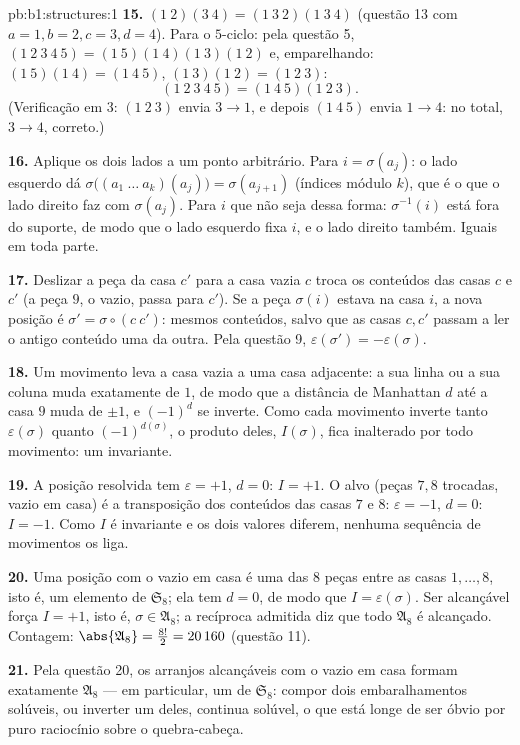 \begin{solution}{pb:b1:structures:1}
\textbf{15.} $(1\ 2)(3\ 4) = (1\ 3\ 2)(1\ 3\ 4)$ (questão 13
com $a{=}1, b{=}2, c{=}3, d{=}4$). Para o $5$-ciclo: pela
questão 5, $(1\ 2\ 3\ 4\ 5) = (1\ 5)(1\ 4)(1\ 3)(1\ 2)$ e,
emparelhando: $(1\ 5)(1\ 4) = (1\ 4\ 5)$, $(1\ 3)(1\ 2) = (1\ 2\ 3)$:
\[
(1\ 2\ 3\ 4\ 5) = (1\ 4\ 5)(1\ 2\ 3) .
\]
(Verificação em $3$: $(1\ 2\ 3)$ envia $3 \to 1$, e depois $(1\ 4\ 5)$
envia $1 \to 4$: no total, $3 \to 4$, correto.)

\textbf{16.} Aplique os dois lados a um ponto arbitrário. Para $i =
\sigma(a_j)$: o lado esquerdo dá $\sigma\bigl((a_1\ \dots\
a_k)(a_j)\bigr) = \sigma(a_{j+1})$ (índices módulo $k$), que é
o que o lado direito faz com $\sigma(a_j)$. Para $i$ que não seja dessa
forma: $\sigma^{-1}(i)$ está fora do suporte, de modo que o lado esquerdo
fixa $i$, e o lado direito também. Iguais em toda parte.

\textbf{17.} Deslizar a peça da casa $c'$ para a casa vazia
$c$ troca os conteúdos das casas $c$ e $c'$ (a peça $9$, o
vazio, passa para $c'$). Se a peça $\sigma(i)$ estava na casa $i$, a
nova posição é $\sigma' = \sigma \circ (c\ c')$: mesmos conteúdos,
salvo que as casas $c, c'$ passam a ler o antigo conteúdo uma da outra.
Pela questão 9, $\varepsilon(\sigma') = -\varepsilon(\sigma)$.

\textbf{18.} Um movimento leva a casa vazia a uma casa adjacente: a sua
linha ou a sua coluna muda exatamente de $1$, de modo que a distância de
Manhattan $d$ até a casa $9$ muda de $\pm1$, e $(-1)^d$ se inverte. Como
cada movimento inverte tanto $\varepsilon(\sigma)$ quanto $(-1)^{d(\sigma)}$,
o produto deles, $I(\sigma)$, fica inalterado por todo movimento: um
invariante.

\textbf{19.} A posição resolvida tem $\varepsilon = +1$, $d = 0$:
$I = +1$. O alvo (peças $7, 8$ trocadas, vazio em casa) é a
transposição dos conteúdos das casas $7$ e $8$: $\varepsilon
= -1$, $d = 0$: $I = -1$. Como $I$ é invariante e os dois
valores diferem, nenhuma sequência de movimentos os liga.

\textbf{20.} Uma posição com o vazio em casa é uma 
das $8$ peças entre as casas $1, \dots, 8$, isto é, um elemento de
$\mathfrak S_8$; ela tem $d = 0$, de modo que $I = \varepsilon(\sigma)$.
Ser alcançável força $I = +1$, isto é, $\sigma \in \mathfrak A_8$; a
recíproca admitida diz que todo $\mathfrak A_8$ é alcançado. Contagem:
$\abs{\mathfrak A_8} = \frac{8!}2 = 20\,160$ (questão 11).

\textbf{21.} Pela questão 20, os arranjos alcançáveis com o vazio em
casa formam exatamente $\mathfrak A_8$ --- em particular, um
\emph{} de $\mathfrak S_8$: compor dois embaralhamentos solúveis,
ou inverter um deles, continua solúvel, o que está longe de ser
óbvio por puro raciocínio sobre o quebra-cabeça.


\end{solution}
